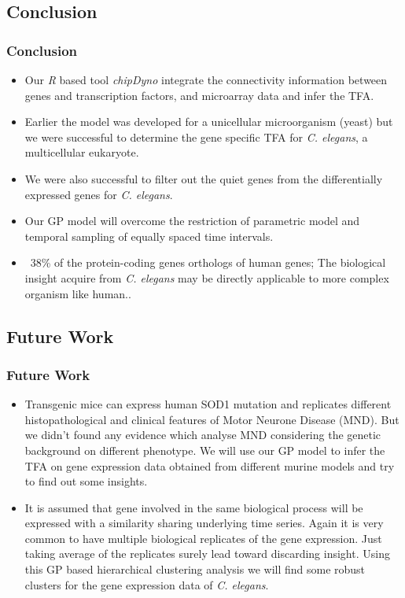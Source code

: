 \documentclass{beamer}
\begin{document}
\subsection{Conclusion}
\begin{frame}
\frametitle{Conclusion}
\begin{itemize}
\item Our \emph{R} based tool \emph{chipDyno} integrate the connectivity information between genes and transcription factors, and microarray data and infer the TFA.
\item {\color{blue}Earlier the model was developed for a unicellular microorganism (yeast) but we were successful to determine the gene specific TFA for \textit{C. elegans}, a multicellular eukaryote.} 
\item We were also successful to filter out the quiet genes from the
differentially expressed genes for \textit{C. elegans}.
\item {\color{blue} Our GP model will overcome the restriction of parametric model and temporal sampling of equally spaced time intervals.}
\item ~38\% of the protein-coding genes orthologs of human genes; The biological insight acquire from \textit{C. elegans} may be directly applicable to more complex organism like human..
\end{itemize}
\end{frame}

\subsection{Future Work}
\begin{frame}
\frametitle{Future Work}
\begin{itemize}
\item Transgenic mice can express human SOD1 mutation and replicates different histopathological and clinical features of Motor Neurone Disease (MND). But we didn't found any evidence which analyse MND considering the genetic background on 
different phenotype. We will use our GP model to infer the TFA on gene expression data obtained from different murine models and try to find out some insights.
\item It is assumed that gene involved in the same biological 
process will be expressed with a similarity sharing underlying time series. Again it is very common to have multiple biological replicates of the gene expression. Just taking average of the replicates surely lead toward discarding insight. Using this GP based hierarchical clustering analysis we will find some robust clusters for the gene expression data of \textit{C. elegans}. 
\end{itemize}
\end{frame}
\end{document}
